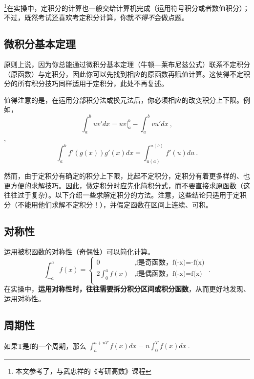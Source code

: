 
\begin{issues}
\issueDraft
\end{issues}


\footnote{本文参考了\cite{同济高}，\cite{Thomas}与武忠祥的《考研高数》课程}在实操中，定积分的计算也一般交给计算机完成（运用符号积分或者数值积分）；不过，既然考试还喜欢考定积分计算，你就\textsl{不得不}会做点题。

\subsection{微积分基本定理}
原则上说，因为你总能通过微积分基本定理（牛顿—莱布尼兹公式）联系不定积分（原函数）与定积分，因此你可以先找到相应的原函数再赋值计算。这使得不定积分的所有积分技巧同样适用于定积分，此处不再复述。

值得注意的是，在运用分部积分法或换元法后，你必须相应的改变积分上下限。例如，$$\int^b_a uv'dx = uv|^b_a-\int^b_a vu'dx~,$$, 
$$\int^b_a f'(g(x))g'(x)dx = \int ^{u(b)}_{u(a)} f'(u)du~.$$


然而，由于定积分有确定的积分上下限，比起不定积分，定积分有着更多样的、也更方便的求解技巧。因此，做定积分时应先化简积分式，而不要直接求原函数（这往往过于复杂）。以下介绍一些求解定积分的方法。注意，这些结论只适用于定积分（不能用他们求解不定积分！），并假定函数在区间上连续、可积。

\subsection{对称性}
运用被积函数的对称性（奇偶性）可以简化计算。
$$
\int ^a_{-a} f(x) = 
\left \{
\begin{aligned}
0&,\text{f是奇函数，f(-x)=-f(x)}\\
2\int ^a_0 f(x)&,\text{f是偶函数，f(-x)=f(x)}\\
\end{aligned}~.
\right.
$$
在实操中，\textbf{运用对称性时，往往需要拆分积分区间或积分函数}，从而更好地发现、运用对称性。

\subsection{周期性}
如果T是f的一个周期，那么 $\int ^{a+nT}_{a} f(x)dx= n\int^{T}_0 f(x)dx~.$

